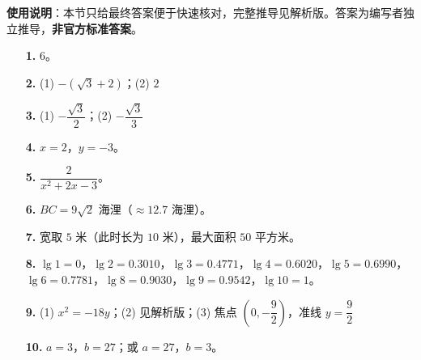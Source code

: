 
\begin{gknotice}
\textbf{使用说明}：本节只给最终答案便于快速核对，完整推导见解析版。答案为编写者独立推导，\textbf{非官方标准答案}。
\end{gknotice}

\begin{itemize}[leftmargin=2.6em]
  \item[\textbf{1.}] $6$。
  \item[\textbf{2.}] (1) $-(\sqrt{3}+2)$；(2) $2$
  \item[\textbf{3.}] (1) $-\dfrac{\sqrt{3}}{2}$；(2) $-\dfrac{\sqrt{3}}{3}$
  \item[\textbf{4.}] $x=2$，$y=-3$。
  \item[\textbf{5.}] $\dfrac{2}{x^2+2x-3}$。
  \item[\textbf{6.}] $BC=9\sqrt{2}$ 海浬（$\approx12.7$ 海浬）。
  \item[\textbf{7.}] 宽取 $5$ 米（此时长为 $10$ 米），最大面积 $50$ 平方米。
  \item[\textbf{8.}] $\lg1=0$，$\lg2=0.3010$，$\lg3=0.4771$，$\lg4=0.6020$，$\lg5=0.6990$，$\lg6=0.7781$，$\lg8=0.9030$，$\lg9=0.9542$，$\lg10=1$。
  \item[\textbf{9.}] (1) $x^2=-18y$；(2) 见解析版；(3) 焦点 $\left(0,-\dfrac{9}{2}\right)$，准线 $y=\dfrac{9}{2}$
  \item[\textbf{10.}] $a=3$，$b=27$；或 $a=27$，$b=3$。
\end{itemize}
